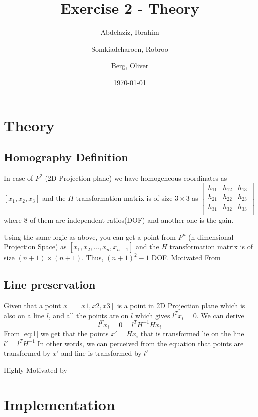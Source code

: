 \documentclass[a4paper, twoside, english]{article}
\title{Exercise 2 - Theory}
\author{
	Abdelaziz, Ibrahim
	\and
	Somkiadcharoen, Robroo
	\and
	Berg, Oliver
}
\date{\today}
\begin{document}
\maketitle


\section{Theory}

\subsection{Homography Definition}
In case of $P^2$ (2D Projection plane) we have homogeneous coordinates as $[x_1, x_2, x_3]$ and the $H$ transformation matrix is of size $3\times3$ as $\begin{bmatrix}
	h_{11}&h_{12}&h_{13} \\
	h_{21}&h_{22}&h_{23}\\
	h_{31}&h_{32}&h_{33} \\
\end{bmatrix}$ where 8 of them are independent ratios(DOF) and another one is the gain.

Using the same logic as above, you can get a point from $P^n$ (n-dimensional Projection Space) as $[x_1, x_2, ... , x_n, x_{n+1}]$ and the $H$ transformation matrix is of size $(n+1)\times (n+1)$. Thus, $(n+1)^2-1$ DOF. Motivated From \cite{Stackoverflow}\cite{DynamicPntoPnAlgnmnt}

\subsection{Line preservation}

Given that a point $x=[x1,x2,x3]$ is a point in 2D Projection plane which is also on a line $l$, and all the points are on $l$ which gives $l^Tx_i=0$. We can derive
\begin{equation}
l^Tx_i=0=l^TH^{-1}Hx_i\label{eq:1}
\end{equation}
From \eqref{eq:1} we get that the points $x'=Hx_i$ that is transformed lie on the line $l'=l^TH^{-1}$ In other words, we can perceived from the equation that points are transformed by $x'$ and line is transformed by $l'$

Highly Motivated by \cite{ProjectiveGeomUMD} \cite{ProjectiveGeomIIT}

\section{Implementation}
\end{document}
